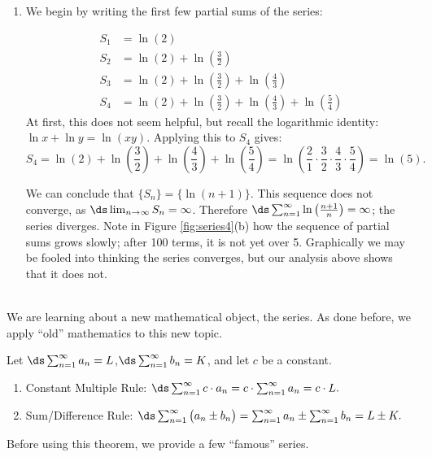 {\begin{enumerate}
\item		We begin by writing the first few partial sums of the series:

\begin{align*}
S_1 &= \ln\left(2\right) \\
S_2 &= \ln\left(2\right)+\ln\left(\frac32\right) \\
S_3 &= \ln\left(2\right)+\ln\left(\frac32\right)+\ln\left(\frac43\right) \\
S_4 &= \ln\left(2\right)+\ln\left(\frac32\right)+\ln\left(\frac43\right)+\ln\left(\frac54\right) 
\end{align*}
At first, this does not seem helpful, but recall the logarithmic identity: $\ln x+\ln y = \ln (xy).$ Applying this to $S_4$ gives:
$$S_4 = \ln\left(2\right)+\ln\left(\frac32\right)+\ln\left(\frac43\right)+\ln\left(\frac54\right) = \ln\left(\frac21\cdot\frac32\cdot\frac43\cdot\frac54\right) = \ln\left(5\right).$$

We can conclude that $\{S_n\} = \big\{\ln (n+1)\big\}$. This sequence  does not converge, as $\ds \lim_{n\to\infty}S_n=\infty$. Therefore  $\ds\sum_{n=1}^\infty  \ln\left(\frac{n+1}{n}\right)=\infty$; the series diverges. Note in Figure \ref{fig:series4}(b) how the sequence of partial sums grows slowly; after 100 terms, it is not yet over 5. Graphically we may be fooled into thinking the series converges, but our analysis above shows that it does not.
\end{enumerate}
\baselineskip
}\\

We are learning about a new mathematical object, the series. As done before, we apply ``old'' mathematics to this new topic.

{Let \quad$\ds \sum_{n=1}^\infty a_n = L$,\quad  $\ds\sum_{n=1}^\infty b_n = K$, and let $c$ be a constant.
\begin{enumerate}
\item  Constant Multiple Rule: $\ds\sum_{n=1}^\infty c\cdot a_n = c\cdot\sum_{n=1}^\infty a_n = c\cdot L.$
\item		Sum/Difference Rule: $\ds\sum_{n=1}^\infty \big(a_n\pm b_n\big) = \sum_{n=1}^\infty a_n \pm \sum_{n=1}^\infty b_n = L \pm K.$
\end{enumerate} 
}

Before using this theorem, we provide a few ``famous'' series.

